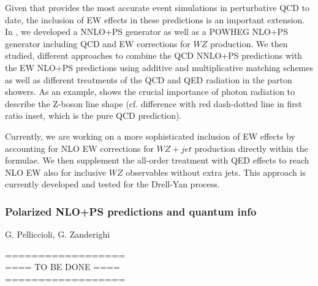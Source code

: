 \documentclass{FBR_Bericht_2025}
\begin{document}
\begin{refsection}
Given that \minnlo{} provides the most accurate event simulations in 
perturbative QCD to date, the inclusion of EW effects in these predictions
is an important extension. In , we developed a \minnlo{} NNLO+PS generator 
as well as a POWHEG NLO+PS  generator including QCD and EW corrections 
for $WZ$ production. We then studied, different approaches to combine the
QCD NNLO+PS predictions with the EW NLO+PS predictions using additive 
and multiplicative matching schemes as well as different treatments of the 
QCD and QED radiation in the parton showers.
As an example,  shows the crucial importance of photon radiation
to describe the Z-boson line shape (cf. difference with 
red dash-dotted line in first ratio inset, which is the pure QCD prediction).

Currently, we are working on a more sophisticated inclusion of EW effects 
by accounting for NLO EW corrections for $WZ+jet$ production
directly within the \minnlo{} formulae. We then supplement the all-order treatment 
with QED effects to reach NLO EW also for inclusive $WZ$ observables without
extra jets. This approach is currently developed and tested for the Drell-Yan process.


\subsubsection{Polarized NLO+PS predictions and quantum info}
\begin{Namen}
G. Pelliccioli, G. Zanderighi
\end{Namen}
%
{\color{red} ==================\\ ====\; TO BE DONE\; ====\\ ==================}
%
\printbibliography[heading=subbibliography]
\end{refsection}
\end{document}
